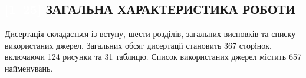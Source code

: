 

\begin{center}
\section*{
\textcolor{white}{[1--25]}
\MakeUppercase{Загальна характеристика роботи}
\textcolor{white}
{\cite{Olikh2018JAP,Olikh2018SM,Olikh:Ultras2016,Olikh2016JSem,
Olikh:Rev,OlikhJAP,Olikh:Ultras,Olikh:UPJ2014,
Olikh:2013IEEE,Olikh:SEMT2013,Olikh:FTP2013,Olikh:UPJ2013,
Olikh:FTP2011,Olikh:SEMT2011,Olikh:UPJ2010,Gorb2010,Olikh:FTP2009,
Olikh:SEMT2007,Olikh:MRS2007,Olikh:PZTF2006,
Olikh:PhChOM2005,Olikh:PJE2004,Olikh:SEMT2004,Olikh:SPQEO2003,
Olikh:Visn2003,
1UNCPS,3Tomsk,1SEMST,50IUFFC,9APTTE,2005IUS,ICU2007SC,ICU2007GA,2007MRS,3UNCPS,6DrogGorb,6Drog,
4UNCPS,2009DRIP13,4Kremen,7Drog,5UNCPS,2012Ternop,14Plivk,8Drog,2013Buk,6UNCPS,2014IUSOl,2014IUS,6SEMST,
2015ICU,6CPFCS,7UNCPS,2017MEICS}}
}
\end{center}




{\structureTXT}
Дисертація складається із вступу, шести розділів, загальних висновків та списку використаних джерел.
Загальних обсяг дисертації становить
367 сторiнок, включаючи 124 рисунки та 31 таблицю.
Список використаних джерел містить 657 найменувань.

